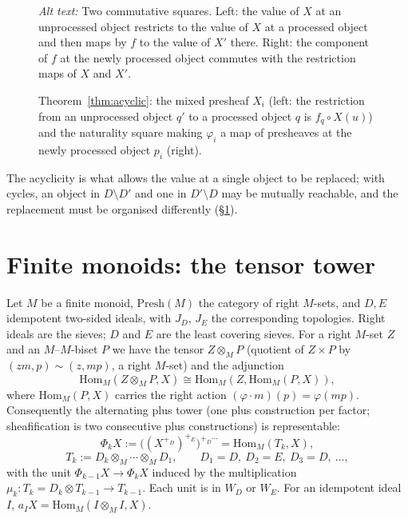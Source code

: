 \documentclass[11pt]{amsart}
\theoremstyle{definition}
\newcommand{\Presh}{\mathrm{Presh}}
\newcommand{\Hom}{\mathrm{Hom}}
\begin{document}
\begin{figure}[ht]
\centering
{}
\caption{Theorem~\ref{thm:acyclic}: the mixed presheaf $X_i$ (left: the
restriction from an unprocessed object $q'$ to a processed object $q$ is
$f_q\circ X(u)$) and the naturality square making $\varphi_i$ a map of
presheaves at the newly processed object $p_i$ (right).}
\label{fig:acyclic}
\par\smallskip\noindent\textit{Alt text:} Two commutative squares. Left: the
value of $X$ at an unprocessed object restricts to the value of $X$ at a
processed object and then maps by $f$ to the value of $X'$ there. Right: the
component of $f$ at the newly processed object commutes with the restriction
maps of $X$ and $X'$.
\end{figure}

The acyclicity is what allows the value at a single object to be replaced;
with cycles, an object in $D\setminus D'$ and one in $D'\setminus D$ may be
mutually reachable, and the replacement must be organised differently
(\S\ref{sec:monoid}).

\section{Finite monoids: the tensor tower}\label{sec:monoid}

Let $M$ be a finite monoid, $\Presh(M)$ the category of right $M$-sets, and
$D,E$ idempotent two-sided ideals, with $J_D$, $J_E$ the corresponding
topologies. Right ideals are the sieves; $D$ and $E$ are the least covering
sieves. For a right $M$-set $Z$ and an $M$--$M$-biset $P$ we have the tensor
$Z\otimes_MP$ (quotient of $Z\times P$ by $(zm,p)\sim(z,mp)$, a right $M$-set)
and the adjunction
\begin{equation}\label{eq:adj}
\Hom_M(Z\otimes_MP,X)\cong\Hom_M(Z,\Hom_M(P,X)),
\end{equation}
where $\Hom_M(P,X)$ carries the right action $(\varphi\cdot m)(p)=\varphi(mp)$.
Consequently the alternating plus tower (one plus construction per
factor; sheafification is two consecutive plus constructions) is representable:
\[
\Phi_kX:=\bigl((X^{+_{D}})^{+_{E}}\bigr)^{+_D\cdots}=\Hom_M(T_k,X),
\]
\[
T_k:=D_k\otimes_M\cdots\otimes_MD_1,\qquad D_1=D,\ D_2=E,\ D_3=D,\ \dots,
\]
with the unit $\Phi_{k-1}X\to\Phi_kX$ induced by the multiplication
$\mu_k\colon T_k=D_k\otimes T_{k-1}\to T_{k-1}$. Each unit is in $W_D$ or
$W_E$. For an idempotent ideal $I$, $a_IX=\Hom_M(I\otimes_MI,X)$.
\end{document}
